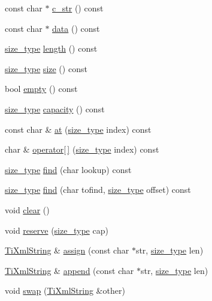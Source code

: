 \begin{DoxyCompactItemize}
const char $\ast$ \hyperlink{classTiXmlString_a5581ca641d915551d3cda90f8e7bf49b}{c\_\-str} () const 
\item 
const char $\ast$ \hyperlink{classTiXmlString_a00abc60f135c7ca1951c7334cc2c7993}{data} () const 
\item 
\hyperlink{classTiXmlString_abeb2c1893a04c17904f7c06546d0b971}{size\_\-type} \hyperlink{classTiXmlString_a3202f27d139a3fac79205f1f3c707727}{length} () const 
\item 
\hyperlink{classTiXmlString_abeb2c1893a04c17904f7c06546d0b971}{size\_\-type} \hyperlink{classTiXmlString_a96103e5c0f67e987fa48527e1f47a1f6}{size} () const 
\item 
bool \hyperlink{classTiXmlString_a9a61e1d11cdb71bea4a4ed79caa793f4}{empty} () const 
\item 
\hyperlink{classTiXmlString_abeb2c1893a04c17904f7c06546d0b971}{size\_\-type} \hyperlink{classTiXmlString_a76e4d6aba7845f4cf9c02332a5fbf916}{capacity} () const 
\item 
const char \& \hyperlink{classTiXmlString_a6763093267bbdecbf03f8840bc349877}{at} (\hyperlink{classTiXmlString_abeb2c1893a04c17904f7c06546d0b971}{size\_\-type} index) const 
\item 
char \& \hyperlink{classTiXmlString_ae8cdc1d46c538536b786f7ae03c0c1d9}{operator\mbox{[}$\,$\mbox{]}} (\hyperlink{classTiXmlString_abeb2c1893a04c17904f7c06546d0b971}{size\_\-type} index) const 
\item 
\hyperlink{classTiXmlString_abeb2c1893a04c17904f7c06546d0b971}{size\_\-type} \hyperlink{classTiXmlString_a5c2b368b5eafe075fd9565cbcbd4c2f9}{find} (char lookup) const 
\item 
\hyperlink{classTiXmlString_abeb2c1893a04c17904f7c06546d0b971}{size\_\-type} \hyperlink{classTiXmlString_a5f2a6fd565751410b392f249a9786db4}{find} (char tofind, \hyperlink{classTiXmlString_abeb2c1893a04c17904f7c06546d0b971}{size\_\-type} offset) const 
\item 
void \hyperlink{classTiXmlString_ab20e06e4c666abf3bdbfb3a1191d4888}{clear} ()
\item 
void \hyperlink{classTiXmlString_a88ecf9f0f00cb5c67b6b637958d7049c}{reserve} (\hyperlink{classTiXmlString_abeb2c1893a04c17904f7c06546d0b971}{size\_\-type} cap)
\item 
\hyperlink{classTiXmlString}{TiXmlString} \& \hyperlink{classTiXmlString_ac72f3d9149b7812c1e6c59402014d0d5}{assign} (const char $\ast$str, \hyperlink{classTiXmlString_abeb2c1893a04c17904f7c06546d0b971}{size\_\-type} len)
\item 
\hyperlink{classTiXmlString}{TiXmlString} \& \hyperlink{classTiXmlString_ad44b21700d2ec24a511367b222b643fb}{append} (const char $\ast$str, \hyperlink{classTiXmlString_abeb2c1893a04c17904f7c06546d0b971}{size\_\-type} len)
\item 
void \hyperlink{classTiXmlString_aa392cbc180752a79f007f4f9280c7762}{swap} (\hyperlink{classTiXmlString}{TiXmlString} \&other)
\end{DoxyCompactItemize}
